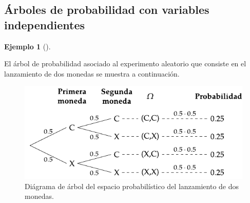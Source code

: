 \documentclass[
  a4paper,
]{scrreport}
\theoremstyle{plain}
\theoremstyle{definition}
\theoremstyle{definition}
\newtheorem{example}{Ejemplo}[chapter]
\theoremstyle{remark}
\begin{document}
\subsection{Árboles de probabilidad con variables
independientes}\label{uxe1rboles-de-probabilidad-con-variables-independientes}

\begin{example}[]\protect\hypertarget{exm-arbol-probabilidad-variables-independientes}{}\label{exm-arbol-probabilidad-variables-independientes}

El árbol de probabilidad asociado al experimento aleatorio que consiste
en el lanzamiento de dos monedas se muestra a continuación.

\begin{figure}[H]

{\centering \includegraphics{img/probabilidad/espacio_probabilistico_monedas.pdf}

}

\caption{Diágrama de árbol del espacio probabilístico del lanzamiento de
dos monedas.}

\end{figure}%

\end{example}
\end{document}
